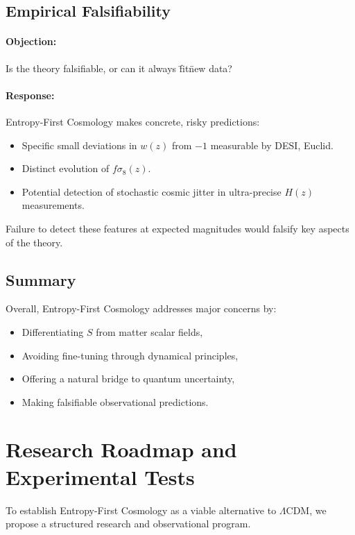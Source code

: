 \documentclass{article}
\begin{document}
\subsection{Empirical Falsifiability}

\paragraph{Objection:}  
Is the theory falsifiable, or can it always \"fit\" new data?

\paragraph{Response:}
Entropy-First Cosmology makes concrete, risky predictions:
\begin{itemize}
    \item Specific small deviations in $w(z)$ from $-1$ measurable by DESI, Euclid.
    \item Distinct evolution of $f\sigma_8(z)$.
    \item Potential detection of stochastic cosmic jitter in ultra-precise $H(z)$ measurements.
\end{itemize}

Failure to detect these features at expected magnitudes would falsify key aspects of the theory.



\subsection{Summary}

Overall, Entropy-First Cosmology addresses major concerns by:
\begin{itemize}
    \item Differentiating $S$ from matter scalar fields,
    \item Avoiding fine-tuning through dynamical principles,
    \item Offering a natural bridge to quantum uncertainty,
    \item Making falsifiable observational predictions.
\end{itemize}

\section{Research Roadmap and Experimental Tests}

To establish Entropy-First Cosmology as a viable alternative to $\Lambda$CDM, we propose a structured research and observational program.
\end{document}

